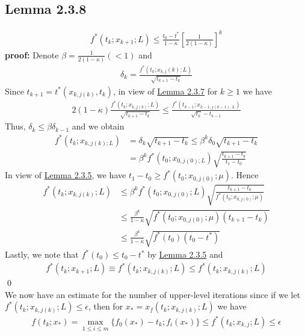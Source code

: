 \documentclass[12pt,a4paper]{article}
\begin{document}
	\subsection*{Lemma 2.3.8}\label{lem238}
	\begin{align*}
		f^*(t_k;x_{k+1};L) \leq \frac{t_0 - t^*}{1 - \kappa}[\frac{1}{2(1 - \kappa)}]^k
	\end{align*}
	\textbf{proof:} Denote $\beta = \frac{1}{2(1 - \kappa)}( < 1)$ and
	\begin{align*}
		\delta_k = \frac{f^*(t_k;x_{k,j}(k);L)}{\sqrt{t_{k+1} - t_k}}
	\end{align*}
	Since $t_{k+1} = t^*(x_{k,j(k)},t_k)$, in view of \hyperref[lem237]{Lemma 2.3.7} for $k \geq 1$ we have
	\begin{align*}
		2(1 - \kappa)\frac{f^*(t_k;x_{k,j(k)};L)}{\sqrt{t_{k+1} - t_k}} \leq \frac{f^*(t_{k-1};x_{k-1,j(k-1);L})}{\sqrt{t_k} - t_{k-1}}
	\end{align*}
	Thus, $\delta_k \leq \beta \delta_{k-1}$ and we obtain
	\begin{align*}
		f^*(t_k;x_{k,j(k);L}) &= \delta_k\sqrt{t_{k+1} - t_k} \leq \beta^k\delta_0\sqrt{t_{k+1}-t_k} \\
		&= \beta^kf^*(t_0;x_{0,j(0);L})\sqrt{\frac{t_{k+1} - t_k}{t_1 - t_0}}
	\end{align*}
	In view of \hyperref[lem235]{Lemma 2.3.5}, we have $t_1 - t_0 \geq f^*(t_0;x_{0,j(0)};\mu)$. Hence
	\begin{align*}
		f^*(t_k;x_{k,j(k)};L) & \leq \beta^kf^*(t_0;x_{0,j(0)};L)\sqrt{\frac{t_{k+1} - t_k}{f^*(t_0;x_{0,j(0)};\mu)}} \\
		&\leq \frac{\beta^k}{1 - \kappa}\sqrt{f^*(t_0;x_{0,j(0)};\mu)(t_{k+1} - t_k)} \\
		&\leq \frac{\beta^k}{1 - \kappa}\sqrt{f^*(t_0)(t_0 - t^*)}
	\end{align*}
	Lastly, we note that $f^*(t_0) \leq t_0 - t^*$ by \hyperref[lem235]{Lemma 2.3.5} and
	\begin{align*}
		f^*(t_k;x_{k+1};L) \equiv f^*(t_k;x_{k,j(k)};L) \leq f^*(t_k;x_{k,j(k)};L)
	\end{align*} 
	\qed \\
	We now have an estimate for the number of upper-level iterations since if we let $f^*(t_k;x_{k,j(k)};L) \leq \epsilon$, then for $x_* = x_f(t_k;x_{k,j(k)};L)$ we have
	\begin{align*}
		f(t_k;x_*) = \max_{1 \leq i \leq m}\{f_0(x_*) - t_k;f_i(x_*)\} \leq f^*(t_k;x_{k,j};L) \leq \epsilon
	\end{align*}
\end{document}
